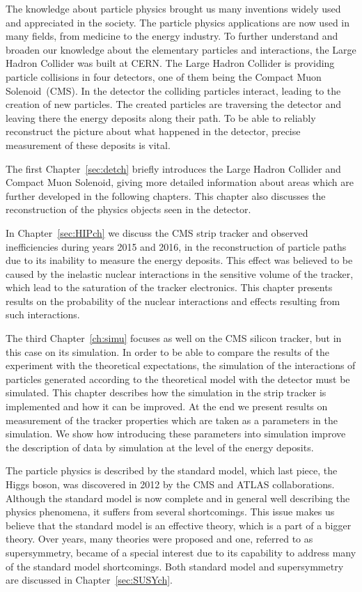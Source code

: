 
The knowledge about particle physics brought us many inventions widely used and appreciated in the society. The particle physics applications are now used in many fields, from medicine to the energy industry. To further understand and broaden our knowledge about the elementary particles and interactions, the Large Hadron Collider was built at CERN. The Large Hadron Collider is providing particle collisions in four detectors, one of them being the Compact Muon Solenoid~(CMS). In the detector the colliding particles interact, leading to the creation of new particles.  The created particles are traversing the detector and leaving there the energy deposits along their path. To be able to reliably reconstruct the picture about what happened in the detector, precise measurement of these deposits is vital.

The first Chapter~\ref{sec:detch} briefly introduces the Large Hadron Collider and Compact Muon Solenoid, giving more detailed information about areas which are further developed in the following chapters. This chapter also discusses the reconstruction of the physics objects seen in the detector.

In Chapter~\ref{sec:HIPch} we discuss the CMS strip tracker and observed inefficiencies during years 2015 and 2016, in the reconstruction of particle paths due to its inability to measure the energy deposits. This effect was believed to be caused by the inelastic nuclear interactions in the sensitive volume of the tracker, which lead to the saturation of the tracker electronics. This chapter presents results on the probability of the nuclear interactions and effects resulting from such interactions. 

The third Chapter~\ref{ch:simu} focuses as well on the CMS silicon tracker, but in this case on its simulation. In order to be able to compare the results of the experiment with the theoretical expectations, the simulation of the interactions of particles generated according to the theoretical model with the detector must be simulated. This chapter describes how the simulation in the strip tracker is implemented and how it can be improved. At the end we present results on measurement of the tracker properties which are taken as a parameters in the simulation. We show how introducing these parameters into simulation improve the description of data by simulation at the level of the energy deposits.

The particle physics is described by the standard model, which last piece, the Higgs boson, was discovered in 2012 by the CMS and ATLAS collaborations. Although the standard model is now complete and in general well describing the physics phenomena, it suffers from several shortcomings. This issue makes us believe that the standard model is an effective theory, which is a part of a bigger theory. Over years, many theories  were proposed and one, referred to as supersymmetry, became of a special interest due to its capability to address many of the standard model shortcomings. Both standard model and supersymmetry are discussed in Chapter~\ref{sec:SUSYch}.

